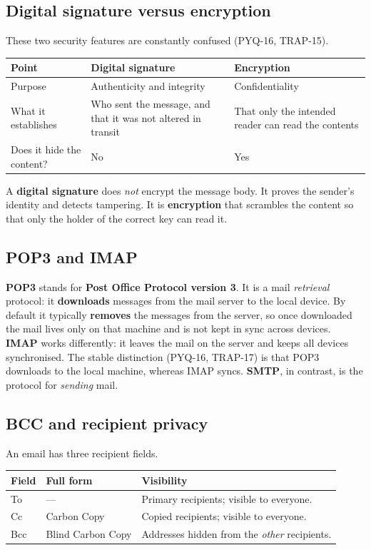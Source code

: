 \documentclass[11pt]{article}
\begin{document}
\subsection*{Digital signature versus encryption}
These two security features are constantly confused (PYQ-16, TRAP-15).

\begin{center}
\begin{tabular}{p{}p{}p{}}
\toprule
\textbf{Point} & \textbf{Digital signature} & \textbf{Encryption} \\
\midrule
Purpose & Authenticity and integrity & Confidentiality \\
What it establishes & Who sent the message, and that it was not altered in
transit & That only the intended reader can read the contents \\
Does it hide the content? & No & Yes \\
\bottomrule
\end{tabular}
\end{center}

A \textbf{digital signature} does \emph{not} encrypt the message body. It
proves the sender's identity and detects tampering. It is \textbf{encryption}
that scrambles the content so that only the holder of the correct key can read
it.

\subsection*{POP3 and IMAP}
\textbf{POP3} stands for \textbf{Post Office Protocol version 3}. It is a mail
\emph{retrieval} protocol: it \textbf{downloads} messages from the mail server
to the local device. By default it typically \textbf{removes} the messages
from the server, so once downloaded the mail lives only on that machine and is
not kept in sync across devices. \textbf{IMAP} works differently: it leaves
the mail on the server and keeps all devices synchronised. The stable
distinction (PYQ-16, TRAP-17) is that POP3 downloads to the local machine,
whereas IMAP syncs. \textbf{SMTP}, in contrast, is the protocol for
\emph{sending} mail.

\subsection*{BCC and recipient privacy}
An email has three recipient fields.

\begin{center}
\begin{tabular}{p{}p{}p{}}
\toprule
\textbf{Field} & \textbf{Full form} & \textbf{Visibility} \\
\midrule
To & --- & Primary recipients; visible to everyone. \\
Cc & Carbon Copy & Copied recipients; visible to everyone. \\
Bcc & Blind Carbon Copy & Addresses hidden from the \emph{other} recipients. \\
\bottomrule
\end{tabular}
\end{center}
\end{document}
